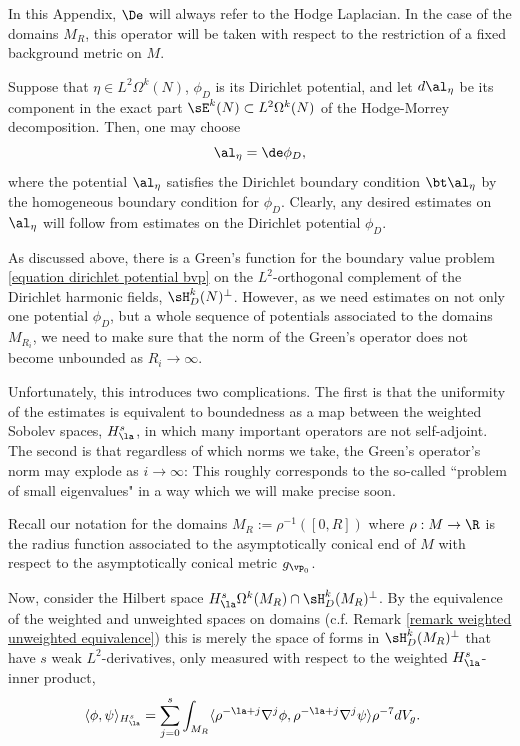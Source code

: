 \documentclass[hidelinks, 12pt, oneside, reqno]{amsart}
\begin{document}
\begin{rmk}
    In this Appendix, $\De$ will always refer to the Hodge Laplacian. In the case of the domains $M_R$, this operator will be taken with respect to the restriction of a fixed background metric on $M$. 
\end{rmk}

Suppose that $\eta \in L^2\Omega^k(N)$, $\phi_D$ is its Dirichlet potential, and let $d\al_\eta$ be its component in the exact part $\sE^k(N) \subset L^2\Omega^k(N)$ of the Hodge-Morrey decomposition. Then, one may choose
\[
\al_\eta = \de \phi_D,
\]
where the potential $\al_\eta$ satisfies the Dirichlet boundary condition $\bt \al_\eta$ by the homogeneous boundary condition for $\phi_D$. Clearly, any desired estimates on $\al_\eta$ will follow from estimates on the Dirichlet potential $\phi_D$.

As discussed above, there is a Green's function for the boundary value problem \eqref{equation dirichlet potential bvp} on the $L^2$-orthogonal complement of the Dirichlet harmonic fields, $\sH_D^k(N)^\perp$.  However, as we need estimates on not only one potential $\phi_D$, but a whole sequence of potentials associated to the domains $M_{R_i}$, we need to make sure that the norm of the Green's operator does not become unbounded as $R_i \rightarrow \infty$. 

Unfortunately, this introduces two complications. The first is that the uniformity of the estimates is equivalent to boundedness as a map between the weighted Sobolev spaces, $H^s_\la$, in which many important operators are not self-adjoint. The second is that regardless of which norms we take, the Green's operator's norm may explode as $i \rightarrow \infty$: This roughly corresponds to the so-called ``problem of small eigenvalues" in a way which we will make precise soon. 

Recall our notation for the domains $M_R := \rho^{-1}([0, R])$ where $\rho: M \rightarrow \R$ is the radius function associated to the asymptotically conical end of $M$ with respect to the asymptotically conical metric $g_{\vp_0}$.

Now, consider the Hilbert space $H^s_\la \Omega^k(M_R) \cap \sH^k_D(M_R)^\perp$. By the equivalence of the weighted and unweighted spaces on domains (c.f. Remark \ref{remark weighted unweighted equivalence}) this is merely the space of forms in $\sH^k_D(M_R)^\perp$ that have $s$ weak $L^2$-derivatives, only measured with respect to the weighted $H^s_\la$-inner product,
\begin{align*}
    \langle \phi, \psi \rangle_{H^s_\la} &= \sum_{j = 0}^s \int_{M_R} \langle \rho^{-\la + j}\nabla^j \phi,\rho^{-\la + j}\nabla^j \psi \rangle \rho^{-7}dV_g.
\end{align*}
\end{document}

